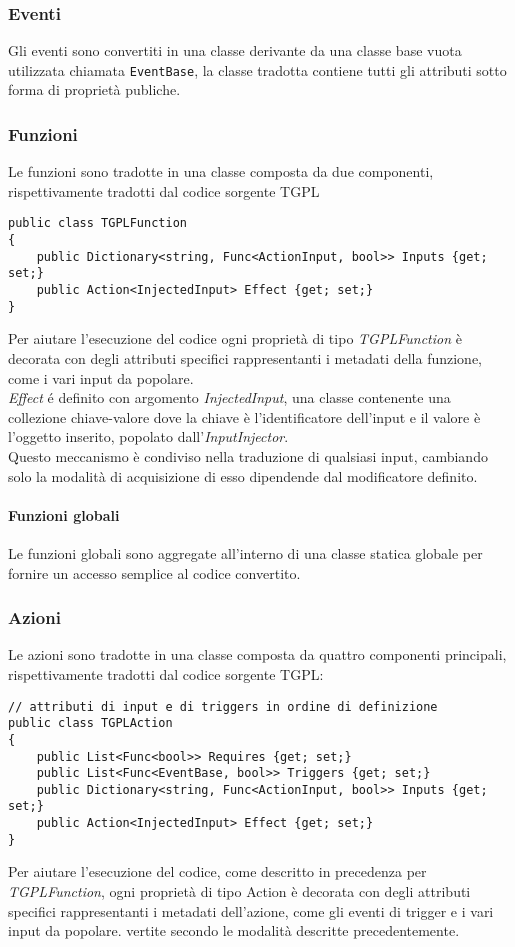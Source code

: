 \subsubsection{Eventi}
Gli eventi sono convertiti in una classe derivante da una classe base vuota utilizzata chiamata \lstinline|EventBase|,
la classe tradotta contiene tutti gli attributi sotto forma di proprietà publiche.

\subsubsection{Funzioni}
Le funzioni sono tradotte in una classe composta da due componenti, rispettivamente tradotti dal codice sorgente TGPL
\newpage
\begin{lstlisting}[style=sharpc_small]
public class TGPLFunction
{
    public Dictionary<string, Func<ActionInput, bool>> Inputs {get; set;}
    public Action<InjectedInput> Effect {get; set;}
}
\end{lstlisting}
Per aiutare l'esecuzione del codice ogni proprietà di tipo \textit{TGPLFunction} è decorata  con degli attributi specifici 
rappresentanti i metadati della funzione, come i vari input da popolare. \\
\textit{Effect} é definito con argomento \textit{InjectedInput}, 
una classe contenente una collezione chiave-valore dove la chiave è l'identificatore dell'input
e il valore è l'oggetto inserito, popolato dall'\textit{InputInjector}. \\
Questo meccanismo è condiviso nella traduzione di qualsiasi input, cambiando solo la modalità
di acquisizione di esso dipendende dal modificatore definito.

\paragraph{Funzioni globali}
Le funzioni globali sono aggregate all'interno di una classe statica globale 
per fornire un accesso semplice al codice convertito.

\subsubsection{Azioni}
Le azioni sono tradotte in una classe composta da quattro componenti principali, rispettivamente tradotti dal codice sorgente TGPL:
\begin{lstlisting}[style=sharpc_small]
// attributi di input e di triggers in ordine di definizione
public class TGPLAction
{
    public List<Func<bool>> Requires {get; set;} 
    public List<Func<EventBase, bool>> Triggers {get; set;}
    public Dictionary<string, Func<ActionInput, bool>> Inputs {get; set;}
    public Action<InjectedInput> Effect {get; set;}
}
\end{lstlisting}
Per aiutare l'esecuzione del codice, come descritto in precedenza per \textit{TGPLFunction},
ogni proprietà di tipo Action è decorata con degli attributi specifici 
rappresentanti i metadati dell'azione, come gli eventi di trigger e i vari input da popolare.
vertite secondo le modalità descritte
precedentemente.

